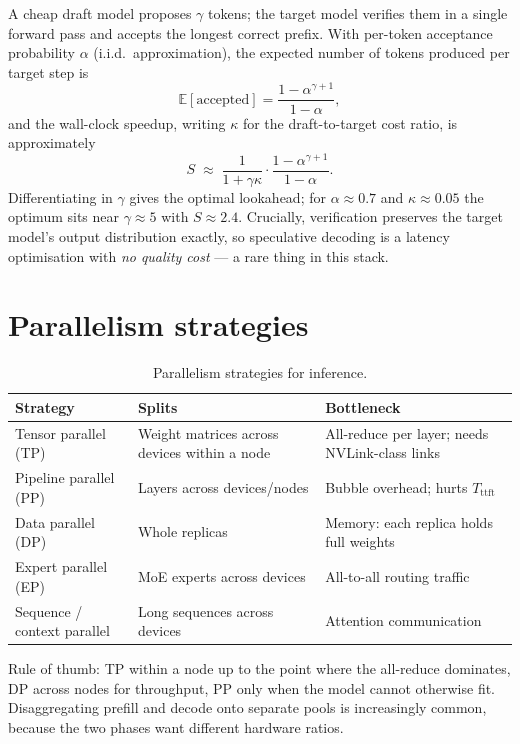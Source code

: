 \documentclass[11pt,twoside,openright]{book}
\theoremstyle{definition}
\theoremstyle{plain}
\theoremstyle{remark}
\newcommand{\ttft}{\ensuremath{T_{\mathrm{ttft}}}}
\newcommand{\E}{\mathbb{E}}
\begin{document}
A cheap draft model proposes $\gamma$ tokens; the target model verifies them in
a single forward pass and accepts the longest correct prefix. With per-token
acceptance probability $\alpha$ (i.i.d.\ approximation), the expected number of
tokens produced per target step is
\begin{equation}
  \E[\text{accepted}] = \frac{1-\alpha^{\gamma+1}}{1-\alpha},
\label{eq:spec}
\end{equation}
and the wall-clock speedup, writing $\kappa$ for the draft-to-target cost ratio,
is approximately
\begin{equation}
  S \;\approx\; \frac{1}{1 + \gamma\kappa}\cdot\frac{1-\alpha^{\gamma+1}}{1-\alpha}.
\end{equation}
Differentiating in $\gamma$ gives the optimal lookahead; for $\alpha \approx 0.7$
and $\kappa \approx 0.05$ the optimum sits near $\gamma \approx 5$ with
$S \approx 2.4$. Crucially, verification preserves the target model's output
distribution exactly, so speculative decoding is a latency optimisation with
\emph{no quality cost} --- a rare thing in this stack.

\section{Parallelism strategies}

\begin{table}[H]
\centering\small
\renewcommand{\arraystretch}{1.3}
\begin{tabularx}{\textwidth}{@{}l X l@{}}
\toprule
\textbf{Strategy} & \textbf{Splits} & \textbf{Bottleneck} \\
\midrule
Tensor parallel (TP) & Weight matrices across devices within a node & All-reduce per layer; needs NVLink-class links \\
Pipeline parallel (PP) & Layers across devices/nodes & Bubble overhead; hurts \ttft{} \\
Data parallel (DP) & Whole replicas & Memory: each replica holds full weights \\
Expert parallel (EP) & MoE experts across devices & All-to-all routing traffic \\
Sequence / context parallel & Long sequences across devices & Attention communication \\
\bottomrule
\end{tabularx}
\caption{Parallelism strategies for inference.}
\end{table}

Rule of thumb: TP within a node up to the point where the all-reduce dominates,
DP across nodes for throughput, PP only when the model cannot otherwise fit.
Disaggregating prefill and decode onto separate pools is increasingly common,
because the two phases want different hardware ratios.
\end{document}
